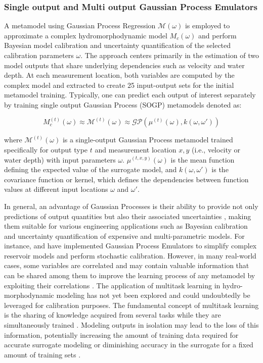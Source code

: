 \documentclass[draft,linenumbers,onecolumn]{agujournal2019} %
\begin{document}
\subsubsection{Single output and Multi output Gaussian Process Emulators}
\label{subsec:sec2.6.2}

A metamodel using Gaussian Process Regression \( \mathcal{M}(\omega) \) is employed to approximate a complex hydromorphodynamic model \( M_c (\omega) \) and perform Bayesian model calibration and uncertainty quantification of the selected calibration parameters \(\omega\). The approach centers primarily in the estimation of two model outputs that share underlying dependencies such as velocity and water depth. At each  measurement location, both variables are computed by the complex model and extracted to create 25 input-output sets for the initial metamodel training. Typically, one can predict each output of interest separately by training single output Gaussian Process (SOGP) metamodels denoted as:

\[
M_c^{(t)}(\omega) \approx \mathcal{M}^{(t)}(\omega) \approx \mathcal{GP}(\mu^{(t)}(\omega), k(\omega, \omega'))
\]

where \( \mathcal{M}^{(t)}(\omega) \) is a single-output Gaussian Process metamodel trained specifically for output type \( t \) and measurement location \( x,y \)  (i.e., velocity or water depth) with input parameters \( \omega \).  \( \mu^{(t,x,y)}(\omega) \) is the mean function defining the expected value of the surrogate model, and \( k(\omega, \omega') \) is the covariance function or kernel, which defines the dependencies between function values at different input locations \( \omega \) and \( \omega' \). 

In general, an advantage of Gaussian Processes is their ability to provide not only predictions of output quantities but also their associated uncertainties \cite{lindholm2022machine}, making them suitable for various engineering applications such as Bayesian calibration and uncertainty quantification of expensive and multi-parametric models. For instance,  and  have implemented Gaussian Process Emulators to simplify complex reservoir models and perform stochastic calibration. However, in many real-world cases, some variables are correlated and may contain valuable information that can be shared among them to improve the learning process of any metamodel by exploiting their correlations \cite{breiman1997predicting}. The application of multitask learning in hydro-morphodynamic modeling has not yet been explored and could undoubtedly be leveraged for calibration purposes. The fundamental concept of multitask learning is the sharing of knowledge acquired from several tasks while they are simultaneously trained \cite{caruana1997multitask}. Modeling outputs in isolation may lead to the loss of this information, potentially increasing the amount of training data required for accurate surrogate modeling or diminishing accuracy in the surrogate for a fixed amount of training sets \cite{liu2018remarks}.
\end{document}
